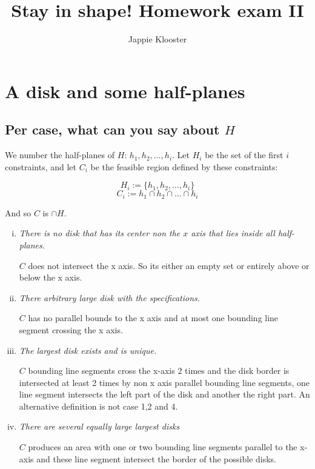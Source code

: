 \documentclass{article}
\begin{document}
\author{Jappie Klooster}
\title{Stay in shape! Homework exam II}
\maketitle
\section{A disk and some half-planes}
\subsection{Per case, what can you say about $H$}
We number the half-planes of $H$: $h_1, h_2,\dots,h_i$.
Let $H_{i}$ be the set of the first $i$ constraints, and
let $C_{i}$ be the feasible region defined by these constraints:

\[ H_i := \{h_1, h_2,\dots, h_i\}\]
\[ C_i := h_1 \cap h_2 \cap \dots \cap h_i\]

And so $C$ is $\cap H$.

\begin{enumerate}[(i)]
	\item \emph{There is no disk that has its center non the $x$ axis
			that lies inside all half-planes.}

		$C$ does not intersect the x axis. So its either an empty set or entirely above or below the x axis.

	\item \emph{There arbitrary large disk with the specifications.}

		$C$ has no parallel bounds to the x axis and
		at most one bounding line segment crossing the x axis.

	\item \emph{The largest disk exists and is unique.}

		$C$ bounding line segments cross the x-axis 2 times and
			the disk border is intersected at least 2 times by non x axis
			parallel bounding line segments, one line segment intersects the
			left part of the disk and another the right part.
			An alternative definition is not case 1,2 and 4.

	\item \emph{There are several equally large largest disks}

		$C$ produces an area with one or two bounding line segments
		parallel to the x-axis and these line segment intersect the border
		of the possible disks.

\end{enumerate}
\end{document}

